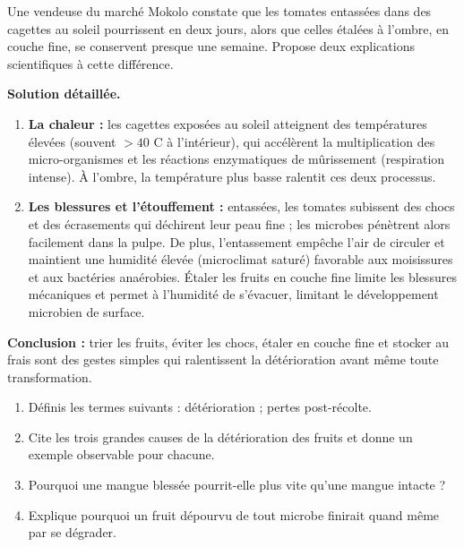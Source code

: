\documentclass[11pt]{article}
\begin{document}
\begin{exoresolu}
Une vendeuse du marché Mokolo constate que les tomates entassées dans des cagettes au soleil pourrissent en deux jours, alors que celles étalées à l'ombre, en couche fine, se conservent presque une semaine. Propose deux explications scientifiques à cette différence.

\tcblower
\textbf{Solution détaillée.}
\begin{enumerate}
\item \textbf{La chaleur :} les cagettes exposées au soleil atteignent des températures élevées (souvent $> 40$ \textdegree C à l'intérieur), qui accélèrent la multiplication des micro-organismes et les réactions enzymatiques de mûrissement (respiration intense). À l'ombre, la température plus basse ralentit ces deux processus.
\item \textbf{Les blessures et l'étouffement :} entassées, les tomates subissent des chocs et des écrasements qui déchirent leur peau fine ; les microbes pénètrent alors facilement dans la pulpe. De plus, l'entassement empêche l'air de circuler et maintient une humidité élevée (microclimat saturé) favorable aux moisissures et aux bactéries anaérobies. Étaler les fruits en couche fine limite les blessures mécaniques et permet à l'humidité de s'évacuer, limitant le développement microbien de surface.
\end{enumerate}
\textbf{Conclusion :} trier les fruits, éviter les chocs, étaler en couche fine et stocker au frais sont des gestes simples qui ralentissent la détérioration avant même toute transformation.
\end{exoresolu}

\begin{exercice}
\begin{enumerate}
\item Définis les termes suivants : détérioration ; pertes post-récolte.
\item Cite les trois grandes causes de la détérioration des fruits et donne un exemple observable pour chacune.
\item Pourquoi une mangue blessée pourrit-elle plus vite qu'une mangue intacte ?
\item Explique pourquoi un fruit dépourvu de tout microbe finirait quand même par se dégrader.
\end{enumerate}
\end{exercice}
\end{document}
